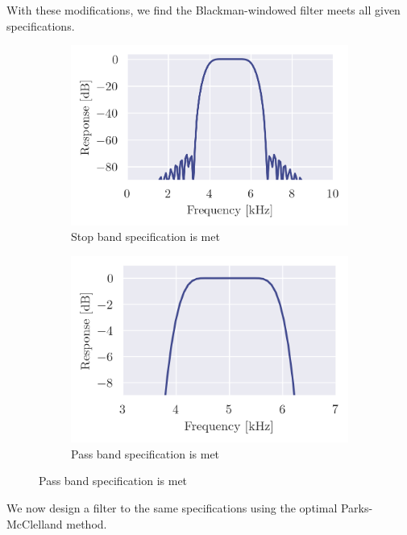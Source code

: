 \newpage

With these modifications, we find the Blackman-windowed filter meets all given specifications.

\begin{figure}[ht]
    \centering
    \begin{subfigure}[b]{0.45\textwidth}
        \centering
        \includegraphics[width=\textwidth]{images/q3_zoom_3.png}
        \caption{Stop band specification is met}
        \label{fig:q3_zoom_3}
    \end{subfigure}
    \hfill
    \begin{subfigure}[b]{0.45\textwidth}
        \centering
        \includegraphics[width=\textwidth]{images/q3_zoom_4.png}
        \caption{Pass band specification is met}
        \label{fig:q3_zoom_4}
    \end{subfigure}
\end{figure}

We now design a filter to the same specifications using the optimal Parks-McClelland method.
